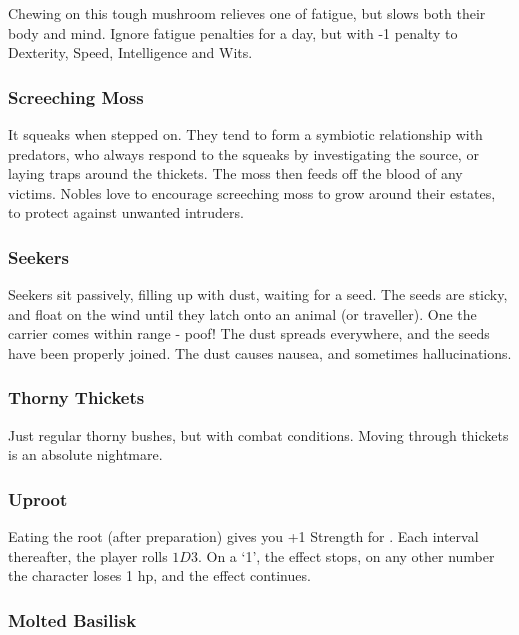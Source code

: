 \begin{multicols}{2}
Chewing on this tough mushroom relieves one of fatigue, but slows both their body and mind.
Ignore \gls{fatigue} penalties for a day, but 
with -1 penalty to Dexterity, Speed, Intelligence and Wits.

\subsubsection{Screeching Moss}
\label{screeching_moss}

It squeaks when stepped on.
They tend to form a symbiotic relationship with predators, who always respond to the squeaks by investigating the source, or laying traps around the thickets.
The moss then feeds off the blood of any victims.
Nobles love to encourage screeching moss to grow around their estates, to protect against unwanted intruders.

\subsubsection{Seekers}
\label{seekers}

Seekers sit passively, filling up with dust, waiting for a seed.
The seeds are sticky, and float on the wind until they latch onto an animal (or traveller).
One the carrier comes within range - poof!
The dust spreads everywhere, and the seeds have been properly joined.
The dust causes nausea, and sometimes hallucinations.

\subsubsection{Thorny Thickets}
\label{thorny_thickets}

Just regular thorny bushes, but with combat conditions.
Moving through thickets is an absolute nightmare.

\subsubsection{Uproot}
\label{uproot}

Eating the root (after preparation) gives you +1 Strength for .
Each \gls{interval} thereafter, the player rolls $1D3$.
On a `1', the effect stops, on any other number the character loses 1 \gls{hp}, and the effect continues.

\subsubsection{Molted Basilisk}
\label{molted_basilisk}


\end{multicols}
